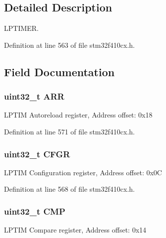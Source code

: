 \subsection{Detailed Description}
L\+P\+T\+I\+M\+ER. 

Definition at line 563 of file stm32f410cx.\+h.



\subsection{Field Documentation}
\subsubsection[{\texorpdfstring{A\+RR}{ARR}}]{ uint32\+\_\+t A\+RR}\hypertarget{struct_l_p_t_i_m___type_def_af17f19bb4aeea3cc14fa73dfa7772cb8}{}\label{struct_l_p_t_i_m___type_def_af17f19bb4aeea3cc14fa73dfa7772cb8}
L\+P\+T\+IM Autoreload register, Address offset\+: 0x18 

Definition at line 571 of file stm32f410cx.\+h.

\subsubsection[{\texorpdfstring{C\+F\+GR}{CFGR}}]{ uint32\+\_\+t C\+F\+GR}\hypertarget{struct_l_p_t_i_m___type_def_a26f1e746ccbf9c9f67e7c60e61085ec1}{}\label{struct_l_p_t_i_m___type_def_a26f1e746ccbf9c9f67e7c60e61085ec1}
L\+P\+T\+IM Configuration register, Address offset\+: 0x0C 

Definition at line 568 of file stm32f410cx.\+h.

\subsubsection[{\texorpdfstring{C\+MP}{CMP}}]{ uint32\+\_\+t C\+MP}\hypertarget{struct_l_p_t_i_m___type_def_a12521d40371a2f123a6834c74f2b2041}{}\label{struct_l_p_t_i_m___type_def_a12521d40371a2f123a6834c74f2b2041}
L\+P\+T\+IM Compare register, Address offset\+: 0x14 

